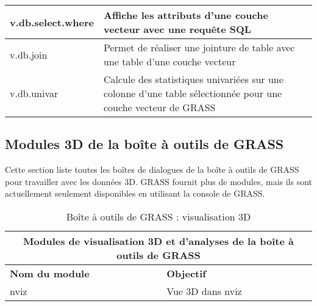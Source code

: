 \begin{table}[ht]
\begin{tabular}{|p{4cm}|p{12cm}|}
  \hline v.db.select.where & Affiche les attributs d'une couche vecteur avec une requ\^ete SQL\\
  \hline v.db.join & Permet de r\'ealiser une jointure de table avec une table d'une couche vecteur\\
  \hline v.db.univar & Calcule des statistiques univari\'ees sur une colonne d'une table s\'electionn\'ee pour une couche vecteur de GRASS\\
\hline
\end{tabular}
\end{table}

\clearpage

\subsection{Modules 3D de la bo\^ite \`a outils de GRASS}

Cette section liste toutes les bo\^ites de dialogues de la bo\^ite \`a outils de GRASS pour travailler avec les donn\'ees 3D. GRASS fournit plus de modules, mais ils sont actuellement seulement disponibles en utilisant la console de GRASS.

\begin{table}[ht]
\centering
\caption{Bo\^ite \`a outils de GRASS : visualisation 3D}\medskip
 \begin{tabular}{|p{4cm}|p{12cm}|}
  \hline \multicolumn{2}{|c|}{\textbf{Modules de visualisation 3D et d'analyses de la bo\^ite \`a outils de GRASS}} \\
  \hline \textbf{Nom du module} & \textbf{Objectif} \\
  \hline nviz & Vue 3D dans nviz\\
\hline
\end{tabular}
\end{table}

